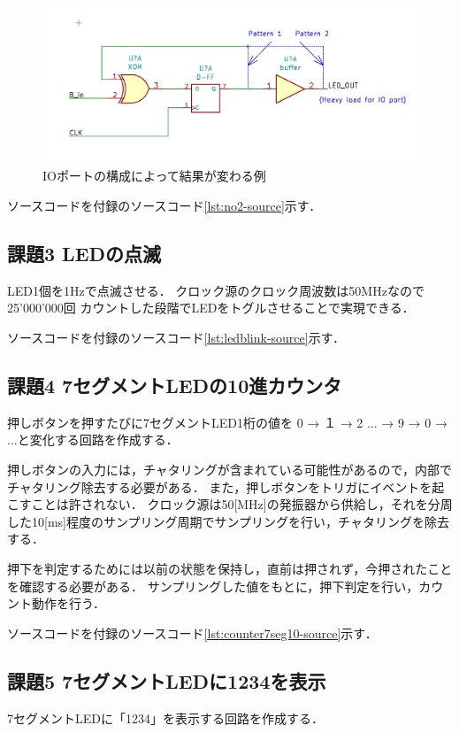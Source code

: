 \begin{figure}[tbp]
  \includegraphics[angle=0,width=160mm]{week4/pics/io-port-whichistrue.png}
  \centering
  \caption{IOポートの構成によって結果が変わる例} %
  \label{fig:io-config} %
\end{figure}

ソースコードを付録のソースコード\ref{lst:no2-source}示す．

\subsection{課題3 LEDの点滅}
LED1個を1Hzで点滅させる．
クロック源のクロック周波数は50MHzなので 25'000'000回 カウントした段階でLEDをトグルさせることで実現できる．

ソースコードを付録のソースコード\ref{lst:ledblink-source}示す．

\subsection{課題4 7セグメントLEDの10進カウンタ}
押しボタンを押すたびに7セグメントLED1桁の値を 0 → １ → 2 ... → 9 → 0 → ...と変化する回路を作成する．

押しボタンの入力には，チャタリングが含まれている可能性があるので，内部でチャタリング除去する必要がある．
また，押しボタンをトリガにイベントを起こすことは許されない．
クロック源は50[MHz]の発振器から供給し，それを分周した10[ms]程度のサンプリング周期でサンプリングを行い，チャタリングを除去する．

押下を判定するためには以前の状態を保持し，直前は押されず，今押されたことを確認する必要がある．
サンプリングした値をもとに，押下判定を行い，カウント動作を行う．

ソースコードを付録のソースコード\ref{lst:counter7seg10-source}示す．

\subsection{課題5 7セグメントLEDに1234を表示}
7セグメントLEDに「1234」を表示する回路を作成する．

